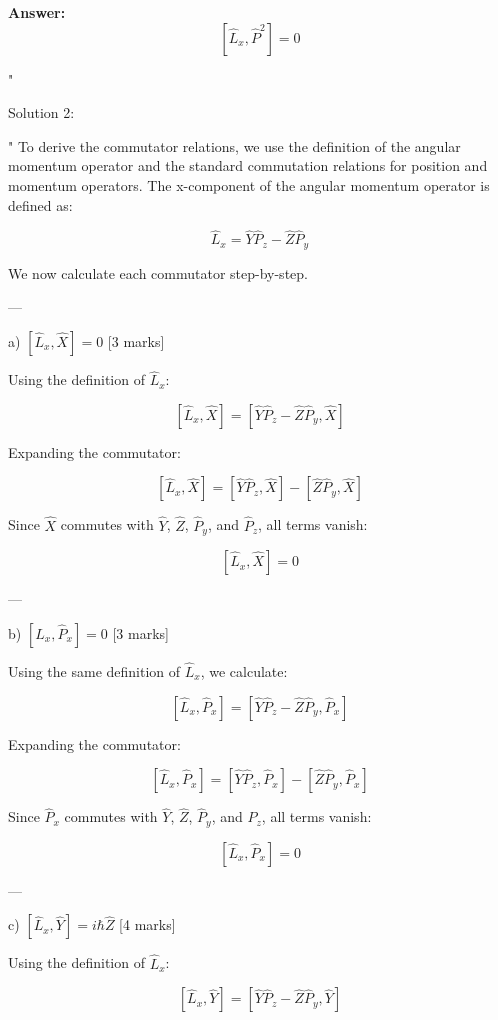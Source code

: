 \textbf{Answer:}
\[
\left[\hat{L}_x, \hat{P}^2\right] = 0
\]


"

Solution 2: 

"
To derive the commutator relations, we use the definition of the angular momentum operator and the standard commutation relations for position and momentum operators. The x-component of the angular momentum operator is defined as:

\[
\hat{L}_x = \hat{Y} \hat{P}_z - \hat{Z} \hat{P}_y
\]

We now calculate each commutator step-by-step.

---

a) \(\left[\hat{L}_x, \hat{X}\right] = 0\) [3 marks]  

Using the definition of \(\hat{L}_x\):

\[
\left[\hat{L}_x, \hat{X}\right] = \left[\hat{Y}\hat{P}_z - \hat{Z}\hat{P}_y, \hat{X}\right]
\]

Expanding the commutator:

\[
\left[\hat{L}_x, \hat{X}\right] = \left[\hat{Y}\hat{P}_z, \hat{X}\right] - \left[\hat{Z}\hat{P}_y, \hat{X}\right]
\]

Since \(\hat{X}\) commutes with \(\hat{Y}\), \(\hat{Z}\), \(\hat{P}_y\), and \(\hat{P}_z\), all terms vanish:

\[
\left[\hat{L}_x, \hat{X}\right] = 0
\]

---

b) \(\left[\hat{L}_x, \hat{P}_x\right] = 0\) [3 marks]  

Using the same definition of \(\hat{L}_x\), we calculate:

\[
\left[\hat{L}_x, \hat{P}_x\right] = \left[\hat{Y}\hat{P}_z - \hat{Z}\hat{P}_y, \hat{P}_x\right]
\]

Expanding the commutator:

\[
\left[\hat{L}_x, \hat{P}_x\right] = \left[\hat{Y}\hat{P}_z, \hat{P}_x\right] - \left[\hat{Z}\hat{P}_y, \hat{P}_x\right]
\]

Since \(\hat{P}_x\) commutes with \(\hat{Y}\), \(\hat{Z}\), \(\hat{P}_y\), and \(\hat{P}_z\), all terms vanish:

\[
\left[\hat{L}_x, \hat{P}_x\right] = 0
\]

---

c) \(\left[\hat{L}_x, \hat{Y}\right] = i\hbar \hat{Z}\) [4 marks]  

Using the definition of \(\hat{L}_x\):

\[
\left[\hat{L}_x, \hat{Y}\right] = \left[\hat{Y}\hat{P}_z - \hat{Z}\hat{P}_y, \hat{Y}\right]
\]


